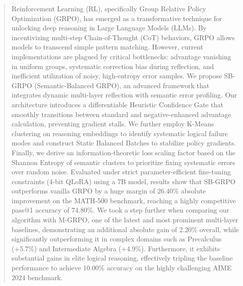 \begin{abstract}
Reinforcement Learning (RL), specifically Group Relative Policy Optimization (GRPO), has emerged as a transformative technique for unlocking deep reasoning in Large Language Models (LLMs). By incentivizing multi-step Chain-of-Thought (CoT) behaviors, GRPO allows models to transcend simple pattern matching. However, current implementations are plagued by critical bottlenecks: advantage vanishing in uniform groups, systematic correction bias during reflection, and inefficient utilization of noisy, high-entropy error samples. We propose SB-GRPO (Semantic-Balanced GRPO), an advanced framework that integrates dynamic multi-layer reflection with semantic error profiling. Our architecture introduces a differentiable Heuristic Confidence Gate that smoothly transitions between standard and negative-enhanced advantage calculation, preventing gradient stalls. We further employ K-Means clustering on reasoning embeddings to identify systematic logical failure modes and construct Static Balanced Batches to stabilize policy gradients. Finally, we derive an information-theoretic loss scaling factor based on the Shannon Entropy of semantic clusters to prioritize fixing systematic errors over random noise. Evaluated under strict parameter-efficient fine-tuning constraints (4-bit QLoRA) using a 7B model, results show that SB-GRPO outperforms vanilla GRPO by a huge margin of 26.40\% absolute improvement on the MATH-500 benchmark, reaching a highly competitive pass@1 accuracy of 74.80\%. We took a step further when comparing our algorithm with M-GRPO, one of the latest and most prominent multi-layer baselines, demonstrating an additional absolute gain of 2.20\% overall, while significantly outperforming it in complex domains such as Precalculus (+5.7\%) and Intermediate Algebra (+4.9\%). Furthermore, it exhibits substantial gains in elite logical reasoning, effectively tripling the baseline performance to achieve 10.00\% accuracy on the highly challenging AIME 2024 benchmark.

\end{abstract}